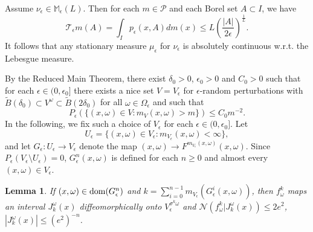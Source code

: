 \documentclass[11pt,oneside]{article}
\theoremstyle{plain}
\newtheorem{lem}{Lemma}[section]
\numberwithin{equation}{section}
\numberwithin{figure}{section}
\numberwithin{table}{section}
\begin{document}
Assume $\nu_{\epsilon} \in \mathbb M_{\epsilon}(L)$. Then for each $m \in \mathcal P$ and each Borel set $A \subset I$, we have
\[
\mathcal T_{\epsilon} m(A) = \int_I p_{\epsilon} (x, A) d m(x) \leq L \left( \frac{|A|}{2\epsilon} \right)^{\frac{1}{L}}.
\]
It follows that any stationary measure $\mu_{\epsilon}$ for $\nu_{\epsilon}$ is absolutely continuous w.r.t. the Lebesgue measure.


By the Reduced Main Theorem, there exist $\delta_0 > 0$, $\epsilon_0 > 0$ and $C_0 > 0$ such that for each $\epsilon \in (0, \epsilon_0]$ there exists a nice set $V = V_{\epsilon}$ for $\epsilon$-random perturbations with $\tilde B(\delta_0) \subset V^{\omega} \subset \tilde B(2 \delta_0)$ for all $\omega \in \Omega_{\epsilon}$ and such that 
\begin{equation}
P_{\epsilon} (\{ (x, \omega) \in V: m_V(x, \omega) >m \}) \leq C_0 m^{-2}. 
\end{equation}
In the following, we fix such a choice of $V_{\epsilon}$ for each $\epsilon \in (0, \epsilon_0]$. Let 
\[
U_{\epsilon} = \{ (x, \omega) \in V_{\epsilon} : m_{V_{\epsilon}}(x, \omega) < \infty \},
\]
and let $G_{\epsilon} : U_{\epsilon} \to V_{\epsilon}$ denote the map $(x, \omega) \to F^{m_{V_{\epsilon}}(x, \omega)}(x, \omega)$. Since $P_{\epsilon} (V_{\epsilon} \setminus U_{\epsilon}) = 0$, $G^n_{\epsilon} (x, \omega)$ is defined for each $n \geq 0$ and almost every $(x, \omega) \in V_{\epsilon}$. 


\begin{lem}
If $(x, \omega) \in {\rm dom}(G_{\epsilon}^n)$ and $k = \sum_{i=0}^{n-1} m_{V_{\epsilon}}(G_{\epsilon}^i(x, \omega)) $, then $f_{\omega}^k$ maps an interval $J_k^{\omega} (x)$ diffeomorphically onto $V_{\epsilon}^{\sigma^k \omega}$ and $\mathcal N (f_{\omega}^k| J_k^{\omega} (x) ) \leq 2e^2$, $|J_k^{\omega} (x)| \leq (e^2)^{-n}$.
\end{lem}
\end{document}

